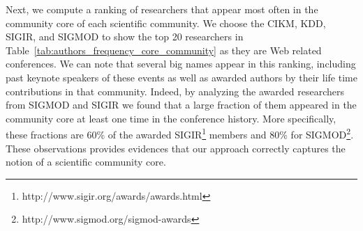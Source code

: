 Next, we compute a ranking of researchers that appear most often in the community core of each scientific community.  We choose the CIKM, KDD, SIGIR, and SIGMOD to show the
top 20 researchers in Table~\ref{tab:authors_frequency_core_community} as they are Web related conferences.  
We can note that several big names appear in this ranking, including past keynote speakers of these events
as well as awarded authors by their life time contributions in that community. Indeed, by analyzing the awarded researchers
from SIGMOD and SIGIR we found that a large fraction of them appeared in the community core at least one time in the conference history. More specifically, these fractions
are 60\% of the awarded SIGIR\footnote{http://www.sigir.org/awards/awards.html} members and 80\% for SIGMOD\footnote{http://www.sigmod.org/sigmod-awards}. These observations
provides evidences that our approach correctly captures the notion of a scientific community core.

